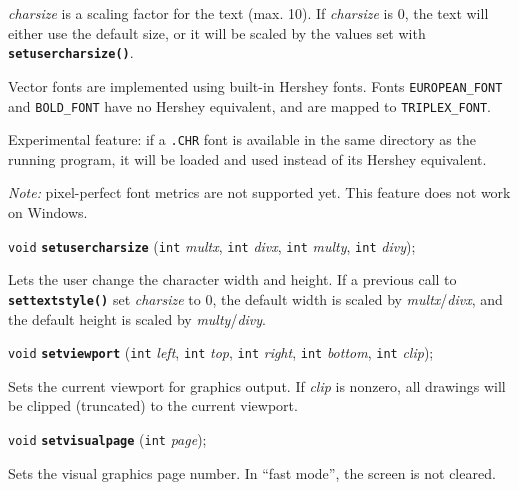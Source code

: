 \documentclass[a4paper,12pt]{article}
\newcommand{\V}{\texttt{void}}      %
\newcommand{\I}{\texttt{int}}       %
\newcommand{\func}[1]{\textbf{\texttt{#1}}}  %
\newcommand{\A}[1]{\emph{#1}}       %
\newcommand{\T}[1]{\texttt{#1}}     %
\newcommand{\file}[1]{\texttt{#1}}
\newenvironment{bgi}
{ %
  \begin{snugshade}
}
{ %
  \end{snugshade}
}
\begin{document}
\A{charsize} is a scaling factor for the text (max. 10). If
\A{charsize} is 0, the text will either use the default size, or it
will be scaled by the values set with \func{setusercharsize()}.

Vector fonts are implemented using built-in Hershey fonts. Fonts
\T{EUROPEAN\_FONT} and \T{BOLD\_FONT} have no Hershey equivalent, and
are mapped to \T{TRIPLEX\_FONT}.

Experimental feature: if a \file{.CHR} font is available in the same
directory as the running program, it will be loaded and used instead
of its Hershey equivalent.

\emph{Note:} pixel-perfect font metrics are not supported yet. This
feature does not work on Windows.


\label{sec:setusercharsize}

\begin{bgi}
\V{} \func{setusercharsize} (\I{} \A{multx}, \I{} \A{divx}, \I{}
\A{multy}, \I{} \A{divy});
\end{bgi}

Lets the user change the character width and height. If a previous
call to \func{settextstyle()} set \A{charsize} to 0, the default width
is scaled by \A{multx}/\A{divx}, and the default height is scaled by
\A{multy}/\A{divy}.


\label{sec:setviewport}

\begin{bgi}
\V{} \func{setviewport} (\I{} \A{left}, \I{} \A{top}, \I{} \A{right},
\I{} \A{bottom}, \I{} \A{clip});
\end{bgi}

Sets the current viewport for graphics output. If \A{clip} is nonzero,
all drawings will be clipped (truncated) to the current viewport.


\label{sec:setvisualpage}

\begin{bgi}
\V{} \func{setvisualpage} (\I{} \A{page});
\end{bgi}

Sets the visual graphics page number. In ``fast mode'', the screen is
not cleared.
\end{document}
